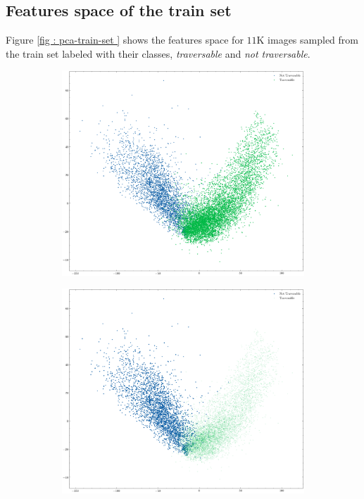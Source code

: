 \documentclass[../document.tex]{subfiles}
\begin{document}
\subsection{Features space of the train set}
Figure \ref{fig : pca-train-set } shows the features space for $11$K images sampled from the train set labeled with their classes, \emph{traversable} and \emph{not traversable}. 
\begin{figure} [htbp]
    \centering
    \begin{subfigure}[b]{1\textwidth}
        \includegraphics[width=\linewidth]{../img/5/pca/pca.png}
    \end{subfigure}
    \begin{subfigure}[b]{0.48\textwidth}
        \includegraphics[width=\linewidth]{../img/5/pca/pca-0.png}

\end{subfigure}
\end{figure}
\end{document}
